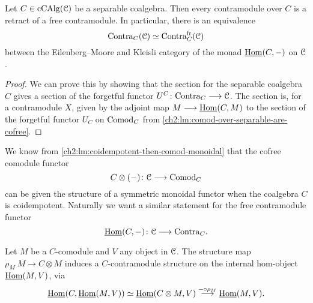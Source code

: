 \begin{proposition}
    \label{ch2:prop:contra-over-separable-are-free}
    Let $C\in \operatorname{cCAlg}(\EuScript{C})$ be a separable coalgebra. Then every contramodule over $C$ is a retract of a free contramodule. In particular, there is an equivalence 
    \[\mathrm{Contra}_C(\EuScript{C})\simeq \mathrm{Contra}_C^{\mathrm{fr}}(\EuScript{C})\]
    between the Eilenberg--Moore and Kleisli category of the monad $\operatorname{\underline{Hom}}(C,-)$ on $\EuScript{C}$. 
\end{proposition}
\begin{proof}
    We can prove this by showing that the section for the separable coalgebra $C$ gives a section of the forgetful functor $U^C\colon\mathrm{Contra}_C\longrightarrow \EuScript{C}$. The section is, for a contramodule $X$, given by the adjoint map $M\longrightarrow \operatorname{\underline{Hom}}(C, M)$ to the section of the forgetful functor $U_C$ on $\mathrm{Comod}_C$ from \cref{ch2:lm:comod-over-separable-are-cofree}.  
\end{proof}


We know from \cref{ch2:lm:coidempotent-then-comod-monoidal} that the cofree comodule functor 
\[C\otimes(-)\colon \EuScript{C}\longrightarrow \mathrm{Comod}_C\]
can be given the structure of a symmetric monoidal functor when the coalgebra $C$ is coidempotent. Naturally we want a similar statement for the free contramodule functor 
\[\operatorname{\underline{Hom}}(C,-)\colon \EuScript{C}\longrightarrow \mathrm{Contra}_C.\]

\begin{remark}
    \label{ch2:rm:contramodule-structure-on-hom-from-comodule}
    Let $M$ be a $C$-comodule and $V$ any object in $\EuScript{C}$. The structure map $\rho_M\: M\to C\otimes M$ induces a $C$-contramodule structure on the internal hom-object $\operatorname{\underline{Hom}}(M, V)$, via 
    \[\operatorname{\underline{Hom}}(C, \operatorname{\underline{Hom}}(M, V))\simeq \operatorname{\underline{Hom}}(C\otimes M, V)\overset{-\circ \rho_M}{\longrightarrow} \operatorname{\underline{Hom}}(M, V).\]
\end{remark}

